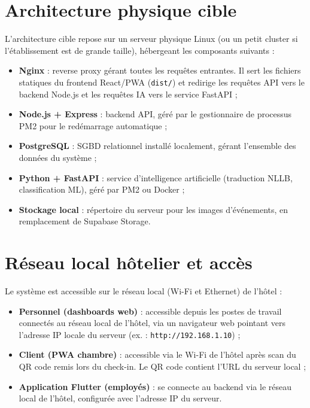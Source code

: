 \section{Architecture physique cible}
\label{sec:architecture_physique}


L'architecture cible repose sur un serveur physique Linux (ou un petit cluster si l'établissement est de grande taille), hébergeant les composants suivants :

\begin{itemize}
  \item \textbf{Nginx} : reverse proxy gérant toutes les requêtes entrantes. Il sert les fichiers statiques du frontend React/PWA (\texttt{dist/}) et redirige les requêtes API vers le backend Node.js et les requêtes IA vers le service FastAPI ;
  \item \textbf{Node.js + Express} : backend API, géré par le gestionnaire de processus PM2 pour le redémarrage automatique ;
  \item \textbf{PostgreSQL} : SGBD relationnel installé localement, gérant l'ensemble des données du système ;
  \item \textbf{Python + FastAPI} : service d'intelligence artificielle (traduction NLLB, classification ML), géré par PM2 ou Docker ;
  \item \textbf{Stockage local} : répertoire du serveur pour les images d'événements, en remplacement de Supabase Storage.
\end{itemize}

\section{Réseau local hôtelier et accès}
\label{sec:reseau_local}

Le système est accessible sur le réseau local (Wi-Fi et Ethernet) de l'hôtel :

\begin{itemize}
  \item \textbf{Personnel (dashboards web)} : accessible depuis les postes de travail connectés au réseau local de l'hôtel, via un navigateur web pointant vers l'adresse IP locale du serveur (ex. : \texttt{http://192.168.1.10}) ;
  \item \textbf{Client (PWA chambre)} : accessible via le Wi-Fi de l'hôtel après scan du QR code remis lors du check-in. Le QR code contient l'URL du serveur local ;
  \item \textbf{Application Flutter (employés)} : se connecte au backend via le réseau local de l'hôtel, configurée avec l'adresse IP du serveur.
\end{itemize}

